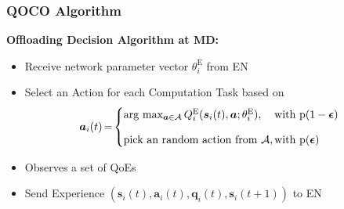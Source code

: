 \begin{frame}
	\frametitle{QOCO Algorithm}

	\textbf{Offloading Decision Algorithm at MD:}
	\vfill


	
	\begin{itemize}[]
		
		
		\item Receive network parameter vector $\theta_i^{\text{E}}$ from EN
				\vspace{2mm}
		\item Select an Action for each Computation Task based on 
			\begin{alignat}{2}
			\hspace*{-2mm}\boldsymbol{a}_i(t) \hspace*{-0.5mm} = \hspace*{-0.5mm}
			\begin{cases} 
				\text{arg $\max_{\boldsymbol{a}\in \mathcal{A}}Q_i^{\text{E}}(\boldsymbol{s}_i(t), \boldsymbol{a}; \theta^{\text{E}}_i)$,} &		\hspace*{-3mm} \text{with $\boldsymbol{\text{p}}(1 -\boldsymbol{\epsilon})$} \vspace{3mm}\\
				\text{pick an random action from $\mathcal{A}$,} & \hspace*{-3mm} \text{with $\boldsymbol{\text{p}}(\boldsymbol{\epsilon})$}
			\end{cases}
			\label{26}  
		\end{alignat}
		\vspace{2mm}
		
		\item Observes a set of QoEs
		\vspace{2mm}
		\item Send Experience $(\boldsymbol{s}_i(t), \boldsymbol{a}_i(t), \boldsymbol{q}_i(t), \boldsymbol{s}_i(t+1))$ to EN
		
	\end{itemize}
	
	
\end{frame}

